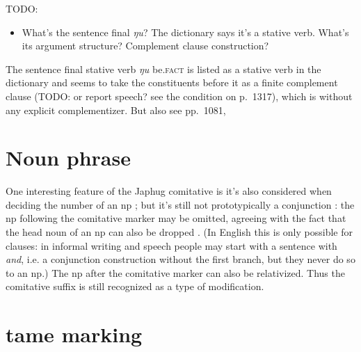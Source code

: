 \documentclass[a4paper, oneside, 12pt]{report}
\newcommand*{\citepage}[1]{p.~{#1}}
\newcommand*{\citepages}[1]{pp.~{#1}}
\newcommand{\form}[1]{\emph{#1}}
\newcommand{\category}[1]{\textsc{#1}}
\begin{document}
TODO: \begin{itemize}
    \item What's the sentence final \form{ŋu}? The dictionary says it's a stative verb.
        What's its argument structure?
        Complement clause construction?
\end{itemize}

The sentence final stative verb \form{ŋu} be.\category{fact} is 
listed as a stative verb in the dictionary
and seems to take the constituents before it 
as a finite complement clause (TODO: or report speech? see the condition on \citepage{1317}),
which is without any explicit complementizer. 
But also see \citepages{1081, }

\chapter{Noun phrase}

One interesting feature of the Japhug comitative 
is it's also considered when deciding the number of an \acs{np}
\citep[\citepage{332}]{jacques2021grammar};
but it's still not prototypically a conjunction \citep[\citepage{420}]{jacques2021grammar}:
the \acs{np} following the comitative marker 
may be omitted, 
agreeing with the fact 
that the head noun of an \acs{np}
can also be dropped \citep[\citepage{425}]{jacques2021grammar}.
(In English this is only possible for clauses:
in informal writing and speech people may start with a sentence with \form{and},
i.e. a conjunction construction 
without the first branch,
but they never do so to an \acs{np}.)
The \acs{np} after the comitative marker can also be relativized.
Thus the comitative suffix is still recognized as a type of 
modification.

\chapter{\acs{tame} marking}
\end{document}

